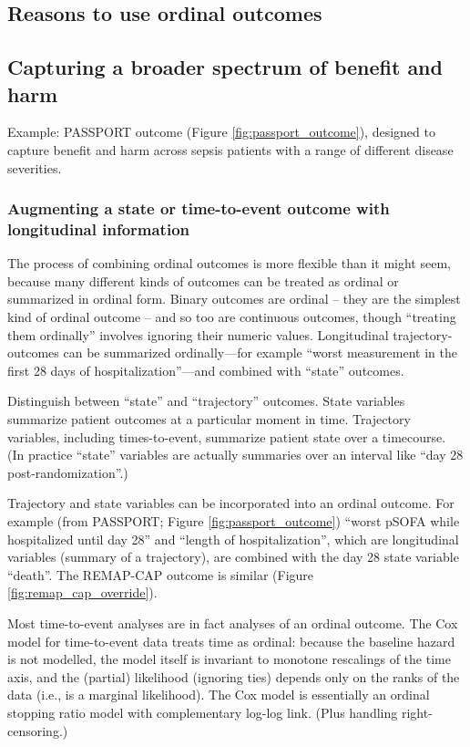 \documentclass[
  11pt,
  fleqn
]{article}
\begin{document}
\subsection{Reasons to use ordinal outcomes}

\subsection{Capturing a broader spectrum of benefit and harm}

Example: PASSPORT outcome (Figure \ref{fig:passport_outcome}),
designed to capture benefit and harm across sepsis patients with a
range of different disease severities.

\subsubsection{Augmenting a state or time-to-event outcome with
longitudinal information}

The process of combining ordinal outcomes is more flexible than it
might seem, because many different kinds of outcomes can be treated as ordinal
or summarized in ordinal form. Binary
outcomes are ordinal -- they are the simplest kind of
ordinal outcome -- and so too are continuous outcomes, though
``treating them ordinally'' involves ignoring their numeric values.
Longitudinal trajectory-outcomes can be summarized ordinally---for
example ``worst measurement in the first 28 days of
hospitalization''---and combined with ``state'' outcomes.

Distinguish between ``state'' and ``trajectory'' outcomes. State
variables summarize patient outcomes at a particular moment in time.
Trajectory variables, including times-to-event, summarize patient
state over a timecourse. (In practice ``state'' variables are
actually summaries over an interval like ``day 28 post-randomization''.)

Trajectory and state variables can be incorporated into an
ordinal outcome. For
example (from PASSPORT; Figure \ref{fig:passport_outcome})
``worst pSOFA while
hospitalized until day 28'' and ``length of hospitalization'', which are
longitudinal variables (summary of a trajectory), are combined
with the day 28
state variable ``death''. The REMAP-CAP outcome is similar (Figure
\ref{fig:remap_cap_override}).

Most time-to-event analyses are in fact analyses of an ordinal
outcome. The Cox
model for time-to-event data treats time as ordinal: because the baseline
hazard is not modelled, the model itself is invariant to monotone
rescalings of
the time axis, and the (partial) likelihood (ignoring ties)
depends only on the
ranks of the data (i.e., is a marginal likelihood). The Cox model is
essentially an ordinal stopping ratio model with complementary log-log link.
(Plus handling right-censoring.)
\end{document}
